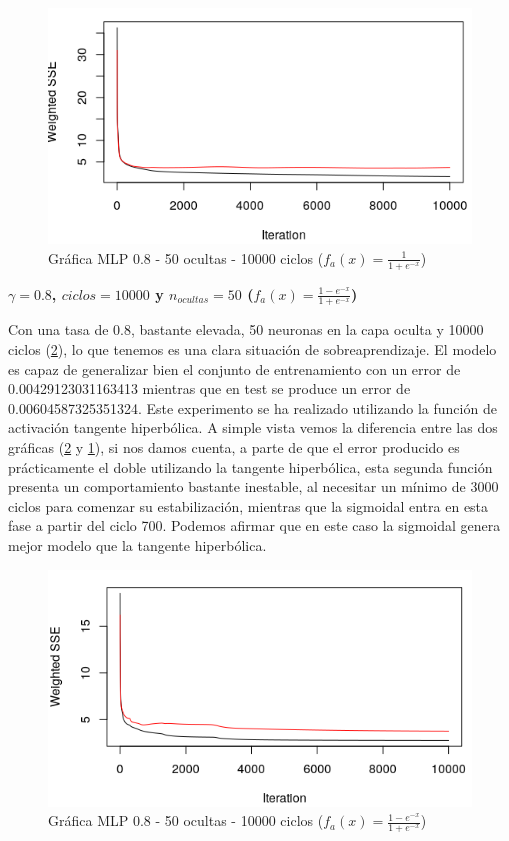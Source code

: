 \documentclass[11pt,spanish,listoffigures,listoftables]{workluis}
\begin{document}
\begin{figure}[H]
\centering
\includegraphics[scale=0.5]{500810000sig}
\caption{Gráfica MLP 0.8 - 50 ocultas - 10000 ciclos ($f_{a}(x) = \frac{1}{1+e^{-x}}$)}\label{fig:500810000sig}
\end{figure}

\par \textbf{$\gamma = 0.8$, $ciclos = 10000$ y $n_{ocultas} = 50$ ($f_{a}(x) = \frac{1-e^{-x}}{1+e^{-x}}$)}

\par Con una tasa de 0.8, bastante elevada, 50 neuronas en la capa oculta y 10000 ciclos (\ref{fig:500810000tan}), lo que tenemos es una clara situación de sobreaprendizaje. El modelo es capaz de generalizar bien el conjunto de entrenamiento con un error de 0.00429123031163413 mientras que en test se produce un error de 0.00604587325351324. Este experimento se ha realizado utilizando la función de activación tangente hiperbólica. A simple vista vemos la diferencia entre las dos gráficas (\ref{fig:500810000tan} y \ref{fig:500810000sig}), si nos damos cuenta, a parte de que el error producido es prácticamente el doble utilizando la tangente hiperbólica, esta segunda función presenta un comportamiento bastante inestable, al necesitar un mínimo de 3000 ciclos para comenzar su estabilización, mientras que la sigmoidal entra en esta fase a partir del ciclo 700. Podemos afirmar que en este caso la sigmoidal genera mejor modelo que la tangente hiperbólica.

\begin{figure}[H]
\centering
\includegraphics[scale=0.5]{500810000tan}
\caption{Gráfica MLP 0.8 - 50 ocultas - 10000 ciclos ($f_{a}(x) = \frac{1-e^{-x}}{1+e^{-x}}$)}\label{fig:500810000tan}
\end{figure}
\end{document}
